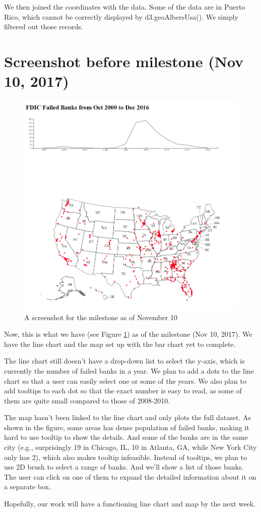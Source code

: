 We then joined the coordinates with the data. Some of the data are in Puerto
Rico, which cannot be correctly displayed by d3.geoAlbersUsa(). We simply
filtered out those records.

\newpage

\section{Screenshot before milestone (Nov 10, 2017)}

\begin{figure}[!h]
    \centering
    \includegraphics[width=\textwidth]{fig/Nov10}
    \caption{A screenshot for the milestone as of November 10}
    \label{fig:milestone}
\end{figure}

Now, this is what we have (see Figure \ref{fig:milestone}) as of the milestone
(Nov 10, 2017). We have the line chart and the map set up with the bar chart
yet to complete. 

The line chart still doesn't have a drop-down list to select
the y-axis, which is currently the number of failed banks in a year. We plan
to add a dots to the line chart so that a user can easily select one or some
of the years. We also plan to add tooltips to each dot so that the exact
number is easy to read, as some of them are quite small compared to those of
2008-2010.

The map hasn't been linked to the line chart and only plots the full dataset.
As shown in the figure, some areas has dense population of failed banks,
making it hard to use tooltip to show the details. And some of the banks are
in the same city (e.g., surprisingly 19 in Chicago, IL, 10 in Atlanta, GA,
while New York City only has 2), which also makes tooltip infeasible. Instead
of tooltips, we plan to use 2D brush to select a range of banks. And we'll
show a list of those banks. The user can click on one of them to expand the
detailed information about it on a separate box.

Hopefully, our work will have a functioning line chart and map by the next
week.
